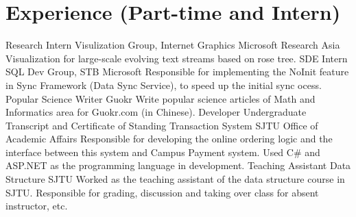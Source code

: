 \documentclass[10pt,a4paper,roman]{moderncv} %
\begin{document}
\section{Experience (Part-time and Intern)}
        {Research Intern}
        {Visulization Group, Internet Graphics}
        {Microsoft Research Asia}
        {}
        {Visualization for large-scale evolving text streams based on rose tree.\footnotemark[3]{}}
        {SDE Intern}
        {SQL Dev Group, STB}
        {Microsoft}
        {}
        {Responsible for implementing the NoInit feature in Sync Framework (Data Sync Service), to speed up the initial sync ocess.}
        {Popular Science Writer}
        {Guokr\footnotemark[4]{}}
        {}
        {}
        {Write popular science articles\footnotemark[5]{} of Math and Informatics area for Guokr.com (in Chinese).}
        {Developer}
        {Undergraduate Transcript and Certificate of Standing Transaction System}
        {SJTU Office of Academic Affairs}
        {}
        {Responsible for developing the online ordering logic and the interface between this system and Campus Payment system.\newline{}%
         Used C\# and ASP.NET as the programming language in development.}
        {Teaching Assistant}
        {Data Structure}
        {SJTU}
        {}
        {Worked as the teaching assistant of the data structure course in SJTU.\newline{}%
         Responsible for grading, discussion and taking over class for absent instructor\footnotemark[6]{}, etc.}
\end{document}
